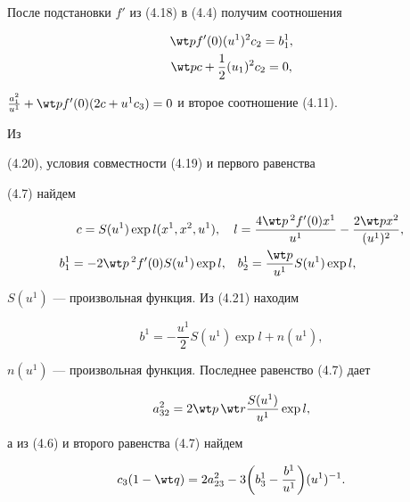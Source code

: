 После подстановки $f'$ из (4.18) в (4.4) получим соотношения 


\begin{gather} 


\wt p f'(0)(u^1)^2c_2=b^1_1,\\ 


\wt pc+\frac{1}{2}(u_1)^2c_2=0, 


\end{gather} 


$\frac{a^2_1}{u^1}+\wt p f'(0)(2c+u^1c_3)=0$ и второе соотношение (4.11). 


Из 


(4.20), условия совместности (4.19) и первого равенства 


(4.7) найдем 


\begin{equation} 


\begin{split}


c=S(u^1)\exp l(x^1,x^2,u^1),\quad 


l&=\frac{4\wt p{}\,^2 f'(0)x^1}{u^1}- 


\frac{2\wt p x^2}{(u^1)^2},\\ 


% 


b^1_1=-2\wt p{}\,^2 f'(0)S(u^1)\exp l,\quad 


&b^1_2=\frac{\wt p}{u^1}S(u^1)\exp l,


\end{split}


\end{equation} 


$S(u^1)$ --- произвольная функция. Из (4.21) находим 


\begin{equation} 


b^1=-\frac{u^1}{2}S(u^1)\exp l+n(u^1), 


\end{equation} 


$n(u^1)$ --- произвольная функция. Последнее равенство (4.7) дает 


\begin{equation} 


a^2_{32}=2\wt p\,\wt r\frac{S(u^1)}{u^1}\exp l, 


\end{equation} 


а из (4.6) и второго равенства (4.7) найдем


\begin{equation} 


c_3(1-\wt q)=2a^2_{23}-3\bigg(b^1_3-\frac{b^1}{u^1} \bigg) 


(u^1)^{-1}. 


\end{equation} 


